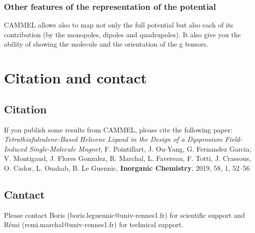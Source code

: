 \documentclass[12pt,a4paper]{article}
\begin{document}
\subsubsection{Other features of the representation of the potential}
CAMMEL allows also to map not only the full potential but also each of its contribution (by the monopoles, dipoles and quadrupoles). It also give you the ability of showing the molecule and the orientation of the g tensors.
\section{Citation and contact}
\subsection{Citation}
If you publish some results from CAMMEL, please cite the following paper:\\

\textit{Tetrathiafulvalene-Based Helicene Ligand in the Design of a Dysprosium Field-Induced Single-Molecule Magnet}, F. Pointillart, J. Ou-Yang, G. Fernandez Garcia, V. Montigaud, J. Flores Gonzalez, R. Marchal, L. Favereau, F. Totti, J. Crassous, O. Cador, L. Ouahab, B. Le Guennic, \textbf{Inorganic Chemistry}, 2019, 58, 1, 52–56 


\subsection{Cantact}
Please contact Boris (boris.leguennic@univ-rennes1.fr) for scientific support and Rémi (remi.marchal@univ-rennes1.fr) for technical support.
\end{document}
